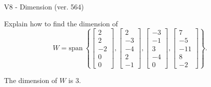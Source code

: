 \begin{exercise}
  \begin{exerciseTitle}V8 - Dimension (ver. 564)\end{exerciseTitle}
  \begin{exerciseStatement}
    Explain how to find the dimension of 
\[W=\mathrm{span}\ \left\{\left[\begin{array}{r}
2 \\
2 \\
-2 \\
0 \\
0
\end{array}\right] , \left[\begin{array}{r}
2 \\
-3 \\
-4 \\
2 \\
-1
\end{array}\right] , \left[\begin{array}{r}
-3 \\
-1 \\
3 \\
-4 \\
0
\end{array}\right] , \left[\begin{array}{r}
7 \\
-5 \\
-11 \\
8 \\
-2
\end{array}\right]\right\}.\]



  \end{exerciseStatement}
  \begin{exerciseAnswer}
   The dimension of \(W\) is  \(3\).
  


  \end{exerciseAnswer}
\end{exercise}